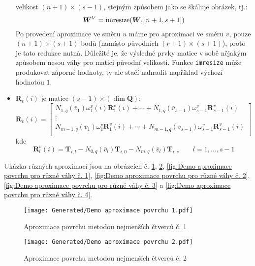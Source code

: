 \begin{itemize}
          velikost $(n+1) \times (s-1)$, stejným způsobem jako se škáluje obrázek, tj.:
          \begin{align}
              \bm{W}^V = \operatorname{imresize}(\bm{W}, [n + 1, s + 1])
          \end{align}
          Po provedení aproximace ve směru $u$ máme pro aproximaci ve směru $v$,
          pouze $(n+1)\times(s+1)$ bodů (namísto původních $(r+1)\times(s+1)$),
          proto je tato redukce nutná.
          Důležité je, že výsledné prvky matice v sobě nějakým způsobem nesou
          váhy pro matici původní velikosti.
          Funkce \texttt{imresize} může produkovat záporné hodnoty,
          ty ale stačí nahradit například výchozí hodnotou $1$.
    \item $\bm{R}_v(i)$ je matice $(s - 1) \times(\dim\bm{Q})$:
          \begin{equation}
              \bm{R}_v(i) =
              \begin{bmatrix}
                  N_{1,q}(\bar{v}_1)\omega^v_1(i)\bm{R}^v_1(i) + \cdots + N_{1, q}(\bar{v}_{s - 1})\omega^v_{s-1}\bm{R}^v_{s - 1}(i) \\
                  \vdots                                                                                                             \\
                  N_{m-1,q}(\bar{v}_1)\omega^v_1\bm{R}^v_1(i) + \cdots + N_{m-1, q}(\bar{v}_{s - 1})\omega^v_{s-1}\bm{R}^v_{s- 1}(i) \\
              \end{bmatrix}
          \end{equation}
          kde
          \begin{equation}
              \bm{R}^v_l(i)  = \bm{T}_{i,l} - N_{0, q}(\bar{v}_l)\bm{T}_{i,0} - N_{m,q}(\bar{v}_l)\bm{T}_{i, s} \quad\quad l = 1, \ldots, s -1
          \end{equation}
\end{itemize}
Ukázka různých aproximací jsou na obrázcích č. \ref{fig:Demo aproximace povrchu č. 1},
\ref{fig:Demo aproximace povrchu č. 2},
\ref{fig:Demo aproximace povrchu pro různé váhy č. 1},
\ref{fig:Demo aproximace povrchu pro různé váhy č. 2},
\ref{fig:Demo aproximace povrchu pro různé váhy č. 3} a
\ref{fig:Demo aproximace povrchu pro různé váhy č. 4}.

\begin{imagepage}
    \begin{figure}[H]
        \centering
        \texttt{[image: Generated/Demo aproximace povrchu 1.pdf]}
        \caption{Aproximace povrchu metodou nejmenších čtverců č. 1}
        \label{fig:Demo aproximace povrchu č. 1}
    \end{figure}
    \begin{figure}[H]
        \centering
        \texttt{[image: Generated/Demo aproximace povrchu 2.pdf]}
        \caption{Aproximace povrchu metodou nejmenších čtverců č. 2}
        \label{fig:Demo aproximace povrchu č. 2}
    \end{figure}
\end{imagepage}

